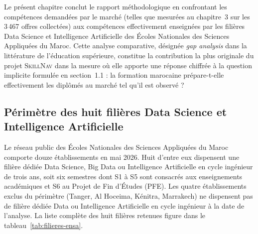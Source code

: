 \documentclass[11pt,a4paper,openany]{report}
\newcommand{\skillnav}{\textsc{SkillNav}\xspace}
\begin{document}
Le pr\'esent chapitre conclut le rapport m\'ethodologique en confrontant les comp\'etences demand\'ees par le march\'e (telles que mesur\'ees au chapitre~3 sur les 3\,467 offres collect\'ees) aux comp\'etences effectivement enseign\'ees par les fili\`eres Data Science et Intelligence Artificielle des \'Ecoles Nationales des Sciences Appliqu\'ees du Maroc. Cette analyse comparative, d\'esign\'ee \emph{gap analysis} dans la litt\'erature de l'\'education sup\'erieure, constitue la contribution la plus originale du projet \skillnav dans la mesure o\`u elle apporte une r\'eponse chiffr\'ee \`a la question implicite formul\'ee en section~1.1 : la formation marocaine pr\'epare-t-elle effectivement les dipl\^om\'es au march\'e tel qu'il est observ\'e ?

\subsection{P\'erim\`etre des huit fili\`eres Data Science et Intelligence Artificielle}

Le r\'eseau public des \'Ecoles Nationales des Sciences Appliqu\'ees du Maroc comporte douze \'etablissements en mai 2026. Huit d'entre eux dispensent une fili\`ere d\'edi\'ee Data Science, Big Data ou Intelligence Artificielle en cycle ing\'enieur de trois ans, soit six semestres dont S1 \`a S5 sont consacr\'es aux enseignements acad\'emiques et S6 au Projet de Fin d'\'Etudes (PFE). Les quatre \'etablissements exclus du p\'erim\`etre (Tanger, Al Hoceima, K\'enitra, Marrakech) ne dispensent pas de fili\`ere d\'edi\'ee Data ou Intelligence Artificielle en cycle ing\'enieur \`a la date de l'analyse. La liste compl\`ete des huit fili\`eres retenues figure dans le tableau~\ref{tab:filieres-ensa}.
\end{document}
